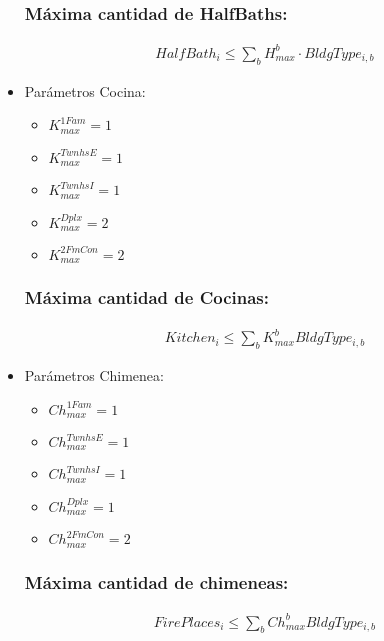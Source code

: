 \documentclass{article}
\begin{document}
\begin{itemize}
    \subsubsection{Máxima cantidad de HalfBaths:}
    \begin{align}
        HalfBath_{i} \leq \sum_{b} H_{max}^{b} \cdot BldgType_{i,b}
    \end{align}
    \item Parámetros Cocina:
    \begin{itemize}
        \item $K_{max}^{1Fam}=1$\\
        \item $K_{max}^{TwnhsE}=1$\\
        \item $K_{max}^{TwnhsI}=1$\\
        \item $K_{max}^{Dplx}=2$\\
        \item $K_{max}^{2FmCon}=2$
    \end{itemize}
    \subsubsection{Máxima cantidad de Cocinas:}
    \begin{align}
        Kitchen_{i}\leq \sum _{b} K_{max}^{b} BldgType_{i,b}
    \end{align}
    \item Parámetros Chimenea:
    \begin{itemize}
        \item $Ch_{max}^{1Fam}=1$\\
        \item $Ch_{max}^{TwnhsE}=1$\\
        \item $Ch_{max}^{TwnhsI}=1$\\
        \item $Ch_{max}^{Dplx}=1$\\
        \item $Ch_{max}^{2FmCon}=2$ 
    \end{itemize}
    \subsubsection{Máxima cantidad de chimeneas:}
    \begin{align}
        FirePlaces_{i} \leq \sum_{b} Ch_{max}^{b} BldgType_{i,b}
    \end{align}
\end{itemize}
\end{document}
